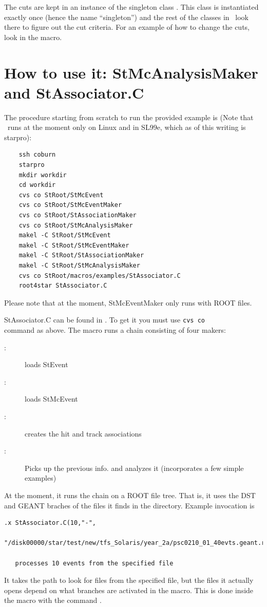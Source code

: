The cuts are kept in an instance of the singleton class .  This
class is instantiated exactly once (hence the name ``singleton'') and the rest of
the classes in \StAssociationMaker\ look there to figure out the cut criteria.
For an example of how to change the cuts, look in the 
macro.  




\section{How to use it: StMcAnalysisMaker and StAssociator.C}
\label{sec:howto}
The procedure starting from scratch to run the provided 
example is (Note that \StAssociationMaker\ runs at the moment
only on Linux and in SL99e, which as of this writing is starpro):
\begin{verbatim}
    ssh coburn 
    starpro
    mkdir workdir
    cd workdir
    cvs co StRoot/StMcEvent
    cvs co StRoot/StMcEventMaker
    cvs co StRoot/StAssociationMaker
    cvs co StRoot/StMcAnalysisMaker
    makel -C StRoot/StMcEvent
    makel -C StRoot/StMcEventMaker
    makel -C StRoot/StAssociationMaker
    makel -C StRoot/StMcAnalysisMaker
    cvs co StRoot/macros/examples/StAssociator.C
    root4star StAssociator.C
\end{verbatim}

Please note that at the moment, StMcEventMaker only runs with ROOT files.

StAssociator.C can be found in . %
To get it you must use \verb+cvs co+\\ command as above. The macro runs a 
chain consisting of four makers:
\begin{description}
\item[:] loads StEvent
\item[:] loads StMcEvent
\item[:] creates the hit and track associations
\item[:] Picks up the previous info. and analyzes it 
    (incorporates a few simple examples)
\end{description}


At the moment, it runs the chain on a ROOT file tree.  That is, it uses the DST
and GEANT braches of the files it finds in the directory.  Example invocation
is 
\begin{verbatim}
.x StAssociator.C(10,"-",
    "/disk00000/star/test/new/tfs_Solaris/year_2a/psc0210_01_40evts.geant.root")

   processes 10 events from the specified file

\end{verbatim}
It takes the path to look for files from the specified file, but the files it
actually opens depend on
what branches are activated in the macro.
This is done inside the macro with the command .


